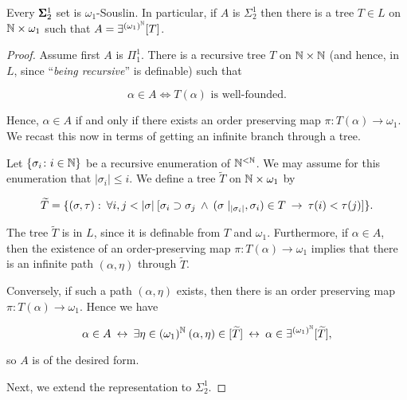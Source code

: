\begin{theorem}[Shoenfield, 1961]\label{thm-tree-repr-sig12}Every $\pmb{\Sigma}^1_2$ set is $\omega_1$-Souslin.
In particular, if $A$ is $\Sigma^1_2$ then there is a tree $T \in L$ on $\mathbb{N} \times \omega_1$ such that $A = \exists^{(\omega_1)^{\mathbb{N}}}[T]$.

\end{theorem}\begin{proof}Assume first $A$ is $\Pi^1_1$. There is a recursive tree $T$ on $\mathbb{N} \times \mathbb{N}$ (and hence, in $L$, since ``\textit{being recursive}'' is definable) such that

\begin{equation}
\alpha \in A \iff T(\alpha) \text{ is well-founded}.
\end{equation}

Hence, $\alpha \in A$ if and only if there exists an order preserving map $\pi: T(\alpha) \to \omega_1$. We recast this now in terms of getting an infinite branch through a tree.

Let $\{\sigma_i \colon i \in \mathbb{N}\}$ be a recursive enumeration of $\mathbb{N}^{<\mathbb{N}}$. We may assume for this enumeration that $|\sigma_i| \leq i$. We define a tree $\widetilde{T}$ on $\mathbb{N} \times \omega_1$ by

\begin{equation}
\widetilde{T} = \{ (\sigma,\tau) : \: \forall i,j < |\sigma| \: [\sigma_i \supset \sigma_j \: \wedge \: (\sigma\mid_{|\sigma_i|}, \sigma_i) \in T \: \to \: \tau(i) < \tau(j)] \}.
\end{equation}

The tree $\widetilde{T}$ is in $L$, since it is definable from $T$ and $\omega_1$. Furthermore, if $\alpha \in A$, then the existence of an order-preserving map $\pi: T(\alpha) \to \omega_1$ implies that there is an infinite path $(\alpha,\eta)$ through $\widetilde{T}$.

Conversely, if such a path $(\alpha,\eta)$ exists, then there is an order preserving map $\pi: T(\alpha) \to \omega_1$. Hence we have

\begin{equation}
\alpha \in A \: \leftrightarrow \: \exists \eta \in (\omega_1)^{\mathbb{N}} \: (\alpha,\eta) \in [\widetilde{T}] \: \leftrightarrow \: \alpha \in \exists^{(\omega_1)^{\mathbb{N}}}[\widetilde{T}],
\end{equation}

so $A$ is of the desired form.

Next, we extend the representation to $\Sigma^1_2$.


\end{proof}
